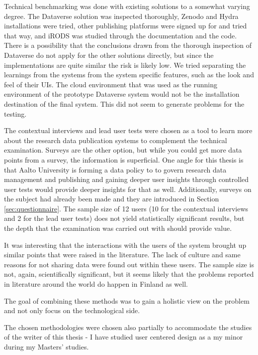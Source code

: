 Technical benchmarking was done with existing solutions to a somewhat varying degree.
The Dataverse solution was inspected thoroughly, Zenodo and Hydra installations were tried,
other publishing platforms were signed up for and tried that way, and iRODS
was studied through the documentation and the code. There is a possibility
that the conclusions drawn from the thorough inspection of Dataverse do not
apply for the other solutions directly, but since the implementations are quite
similar the risk is likely low. We tried separating the learnings from the
systems from the system specific features, such as the look and feel of their
UIs. The cloud environment that was used as the running environment of the prototype
Dataverse system would not be the installation destination of the final system.
This did not seem to generate problems for the testing.

The contextual interviews and lead user tests were chosen as a tool to learn
more about the research data publication systems to complement the technical
examination. Surveys are the other option, but while you could get more data
points from a survey, the information is superficial. One angle for this thesis
is that Aalto University is forming a data policy to to govern research data
management and publishing and gaining deeper user insights through controlled
user tests would provide deeper insights for that as well. Additionally,
surveys on the subject had already been made and they are introduced in
Section \ref{sec:questionnaire}. The sample size
of 12 users (10 for the contextual interviews and 2 for the lead user tests)
does not yield statistically significant results, but the depth that the
examination was carried out with should provide value.

It was interesting that the interactions with the users of the system brought
up similar points that were raised in the literature. The lack of culture and
same reasons for not sharing data were found out within these users.
The sample size is not, again, scientifically significant, but
it seems likely that the problems reported in literature around the world do
happen in Finland as well.

The goal of combining these methods was to gain a holistic view on the problem
and not only focus on the technological side.

The chosen methodologies were chosen also partially to accommodate the studies
of the writer of this thesis - I have studied user centered design as a my
minor during my Masters' studies.

